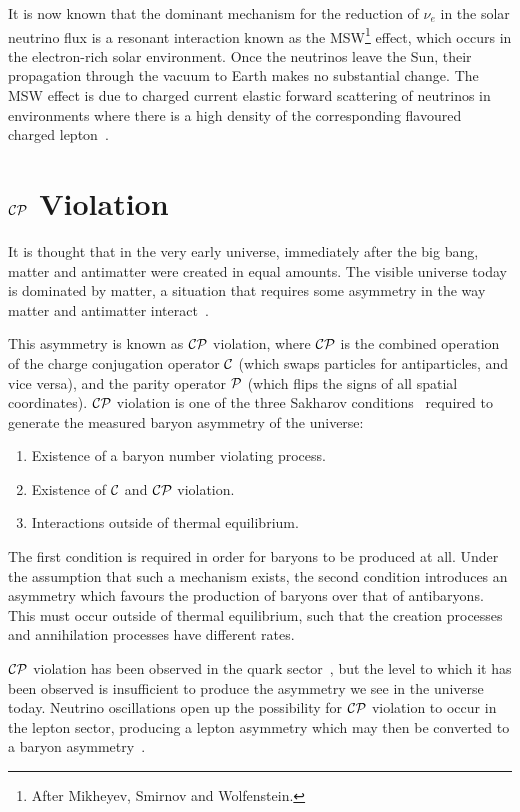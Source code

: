It is now known that the dominant mechanism for the reduction of $\nu_e$ in the solar neutrino flux is a resonant interaction known as the MSW\footnote{After Mikheyev, Smirnov and Wolfenstein.} effect, which occurs in the electron-rich solar environment. Once the neutrinos leave the Sun, their propagation through the vacuum to Earth makes no substantial change. The MSW effect is due to charged current elastic forward scattering of neutrinos in environments where there is a high density of the corresponding flavoured charged lepton~\citep{Zuber2004}.

\section{$\mathcal{C}\mathcal{P}$ Violation}
It is thought that in the very early universe, immediately after the big bang, matter and antimatter were created in equal amounts. The visible universe today is dominated by matter, a situation that requires some asymmetry in the way matter and antimatter interact~\citep{Perkins2000}.

This asymmetry is known as $\mathcal{C}\mathcal{P}$ violation, where $\mathcal{C}\mathcal{P}$ is the combined operation of the charge conjugation operator $\mathcal{C}$ (which swaps particles for antiparticles, and vice versa), and the parity operator $\mathcal{P}$ (which flips the signs of all spatial coordinates). $\mathcal{C}\mathcal{P}$ violation is one of the three Sakharov conditions~\citep{Sakharov1967} required to generate the measured baryon asymmetry of the universe:
\begin{enumerate}
    \item Existence of a baryon number violating process.
    \item Existence of $\mathcal{C}$ and $\mathcal{C}\mathcal{P}$ violation.
    \item Interactions outside of thermal equilibrium.
\end{enumerate}

The first condition is required in order for baryons to be produced at all. Under the assumption that such a mechanism exists, the second condition introduces an asymmetry which favours the production of baryons over that of antibaryons. This must occur outside of thermal equilibrium, such that the creation processes and annihilation processes have different rates.

$\mathcal{C}\mathcal{P}$ violation has been observed in the quark sector~\citep{PDG2012}, but the level to which it has been observed is insufficient to produce the asymmetry we see in the universe today. Neutrino oscillations open up the possibility for $\mathcal{C}\mathcal{P}$ violation to occur in the lepton sector, producing a lepton asymmetry which may then be converted to a baryon asymmetry~\citep{Riotto1999}.

